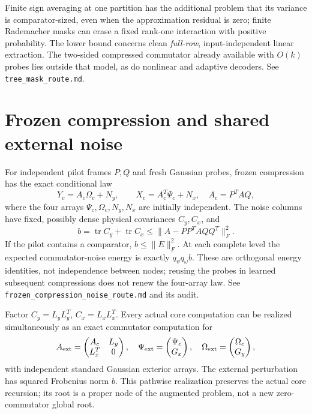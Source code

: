 \documentclass[11pt,oneside,openany,a4paper]{book}
\numberwithin{equation}{chapter}
\theoremstyle{definition}
\theoremstyle{remark}
\newcommand{\sourcefile}[1]{{\small\nolinkurl{#1}}}
\begin{document}
Finite sign averaging at one partition has the additional problem
that its variance is comparator-sized, even when the approximation
residual is zero; finite Rademacher masks can erase a fixed rank-one
interaction with positive probability.  The lower bound concerns clean
\emph{full-row}, input-independent linear extraction.  The two-sided
compressed commutator already available with $O(k)$ probes lies outside
that model, as do nonlinear and adaptive decoders.
See \sourcefile{tree_mask_route.md}.

\section{Frozen compression and shared external noise}
\label{upd:sec:later-frozen}

For independent pilot frames $P,Q$ and fresh Gaussian probes, frozen
compression has the exact conditional law
\[
 Y_c=A_c\Omega_c+N_y,\qquad X_c=A_c^T\Psi_c+N_x,
 \quad A_c=P^TAQ,
\]
where the four arrays $\Psi_c,\Omega_c,N_y,N_x$ are initially
independent.  The noise columns have fixed, possibly dense physical
covariances $C_y,C_x$, and
\[
 b=\operatorname{tr}C_y+\operatorname{tr}C_x
 \le\|A-PP^TAQQ^T\|_F^2.
\]
If the pilot contains a comparator, $b\le\|E\|_F^2$.  At each complete
level the expected commutator-noise energy is exactly
$q_\psi q_\omega b$.  These are orthogonal energy identities, not
independence between nodes; reusing the probes in learned subsequent
compressions does not renew the four-array law.
See \sourcefile{frozen_compression_noise_route.md} and its audit.

Factor $C_y=L_yL_y^T$, $C_x=L_xL_x^T$.  Every actual core computation
can be realized simultaneously as an exact commutator computation for
\[
 A_{\rm ext}=\begin{pmatrix}A_c&L_y\\L_x^T&0\end{pmatrix},
 \quad\Psi_{\rm ext}=\begin{pmatrix}\Psi_c\\G_x\end{pmatrix},
 \quad\Omega_{\rm ext}=\begin{pmatrix}\Omega_c\\G_y\end{pmatrix},
\]
with independent standard Gaussian exterior arrays.  The external
perturbation has squared Frobenius norm $b$.  This pathwise realization
preserves the actual core recursion; its root is a proper node of the
augmented problem, not a new zero-commutator global root.
\end{document}
